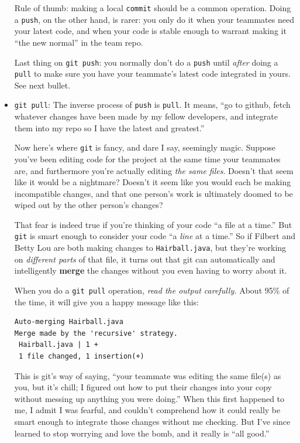 \begin{itemize}
Rule of thumb: making a local \texttt{commit} should be a common operation.
Doing a \texttt{push}, on the other hand, is rarer: you only do it when your
teammates need your latest code, and when your code is stable enough to
warrant making it ``the new normal'' in the team repo.

Last thing on \texttt{git push}: you normally don't do a \texttt{push} until
\textit{after} doing a \texttt{pull} to make sure you have your teammate's
latest code integrated in yours. See next bullet.

\item \texttt{git pull}: The inverse process of \texttt{push} is
\texttt{pull}. It means, ``go to github, fetch whatever changes have been made
by my fellow developers, and integrate them into my repo so I have the latest
and greatest.''

Now here's where \texttt{git} is fancy, and dare I say, seemingly magic.
Suppose you've been editing code for the project at the same time your
teammates are, and furthermore you're actually editing \textit{the same
files}. Doesn't that seem like it would be a nightmare? Doesn't it seem like
you would each be making incompatible changes, and that one person's work is
ultimately doomed to be wiped out by the other person's changes?

That fear is indeed true if you're thinking of your code ``a file at a time.''
But \texttt{git} is smart enough to consider your code ``a \textit{line} at a
time.'' So if Filbert and Betty Lou are both making changes to
\texttt{Hairball.java}, but they're working on \textit{different parts} of
that file, it turns out that git can automatically and intelligently
\textbf{merge} the changes without you even having to worry about it.

When you do a \texttt{git pull} operation, \textit{read the output carefully.}
About 95\% of the time, it will give you a happy message like this:

\begin{Verbatim}[fontsize=\small,samepage=true,frame=none]
Auto-merging Hairball.java
Merge made by the 'recursive' strategy.
 Hairball.java | 1 +
 1 file changed, 1 insertion(+)
\end{Verbatim}

This is git's way of saying, ``your teammate was editing the same file(s) as
you, but it's chill; I figured out how to put their changes into your copy
without messing up anything you were doing.'' When this first happened to me,
I admit I was fearful, and couldn't comprehend how it could really be smart
enough to integrate those changes without me checking. But I've since learned
to stop worrying and love the bomb, and it really is ``all good.''


\end{itemize}
